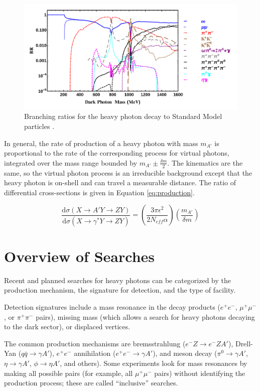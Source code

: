 \begin{figure}[ht]
    \includegraphics[width=\textwidth]{motivation/figs/darkphoton-BR-1-3000-LOG}
    \caption{Branching ratios for the heavy photon decay to Standard Model particles \cite{liu_signals_2015}.}
    \label{fig:branching}
\end{figure}

In general, the rate of production of a heavy photon with mass $m_{A'}$ is proportional to the rate of the corresponding process for virtual photons, integrated over the mass range bounded by $m_{A'}\pm \frac{\delta m}{2}$.
The kinematics are the same, so the virtual photon process is an irreducible background except that the heavy photon is on-shell and can travel a measurable distance.
The ratio of differential cross-sections is given in Equation \ref{eq:production}.

\begin{equation}
    \frac{\mathrm{d}\sigma(X \to A' Y \to Z Y)}{\mathrm{d}\sigma(X \to \gamma^* Y \to Z Y)} = \left(\frac{3\pi\epsilon^2}{2N_{eff} \alpha} \right) \left(\frac{m_{A'}}{\delta m} \right)
    \label{eq:production}
\end{equation}

\section{Overview of Searches}
Recent and planned searches for heavy photons can be categorized by the production mechanism, the signature for detection, and the type of facility.

Detection signatures include a mass resonance in the decay products ($e^+e^-$, $\mu^+\mu^-$, or $\pi^+\pi^-$ pairs), missing mass (which allows a search for heavy photons decaying to the dark sector), or displaced vertices.

The common production mechanisms are bremsstrahlung ($e^- Z \to e^- Z A'$), Drell-Yan ($q \bar{q} \to \gamma A'$), $e^+e^-$ annihilation ($e^+e^- \to \gamma A'$), and meson decay ($\pi^0 \to \gamma A'$, $\eta \to \gamma A'$, $\phi \to \eta A'$, and others).
Some experiments look for mass resonances by making all possible pairs (for example, all $\mu^+\mu^-$ pairs) without identifying the production process; these are called ``inclusive'' searches.

